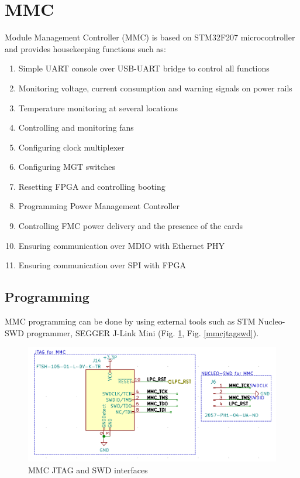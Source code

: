 \documentclass[12pt,oneside,a4]{article}
\begin{document}
\section{MMC}\label{sec:MMC}
Module Management Controller (MMC) is based on STM32F207 microcontroller and provides housekeeping functions such as:
\begin{enumerate}
	\item Simple UART console over USB-UART bridge to control all functions
	\item Monitoring voltage, current consumption and warning signals on power rails
	\item Temperature monitoring at several locations
	\item Controlling and monitoring fans
	\item Configuring clock multiplexer
	\item Configuring MGT switches
	\item Resetting FPGA and controlling booting
	\item Programming Power Management Controller
	\item Controlling FMC power delivery and the presence of the cards
	\item Ensuring communication over MDIO with Ethernet PHY
	\item Ensuring communication over SPI with FPGA
\end{enumerate}

\subsection{Programming}\label{sec:MMC:Programming}
MMC programming can be done by using external tools such as STM Nucleo-SWD programmer, SEGGER J-Link Mini (Fig. \ref{mmcjtag}, Fig. \ref{mmcjtagswd}).

\begin{figure}[H]
\begin{center}
\includegraphics[width=1\linewidth]{mmcjtag.png}
 \caption{MMC JTAG and SWD interfaces}\label{mmcjtag}
\end{center}
\end{figure}
\end{document}
